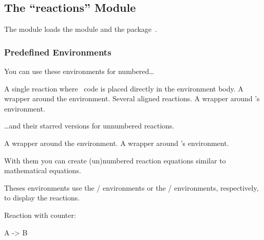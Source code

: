 \documentclass[load-preamble+]{cnltx-doc}
\def\chemmodule*#1{\textquotedblleft#1\textquotedblright}%
\begin{document}
\begin{example}
  \vspace{7mm}
  \setbondoffset{0pt}
  \vspace{1cm}
\end{example}

\subsection{The \chemmodule*{reactions} Module}\label{sec:reactions-module}
The  module loads the  module
and the  package~\cite{pkg:mathtools}.

\subsubsection{Predefined Environments}

You can use these environments for numbered\ldots
\begin{environments}
    A single reaction where \chemformula\ code is placed directly in the
    environment body.  A wrapper around the  environment.
    Several aligned reactions.  A wrapper around 's 
    environment.
\end{environments}

\ldots and their starred versions for unnumbered reactions.
\begin{environments}
    A wrapper around the  environment.
    A wrapper around 's  environment.
\end{environments}

With them you can create (un)numbered reaction equations similar to
mathematical equations.

Theses environments use the / environments or
the / environments, respectively, to display the
reactions.

\begin{example}
  Reaction with counter:
  \begin{reaction}
    A -> B
  \end{reaction}
\end{example}
\end{document}
